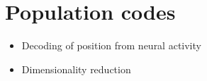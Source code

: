 \section{Population codes}
\label{chap4:sec:4:population_codes}
\begin{itemize}
    \item Decoding of position from neural activity
    \item Dimensionality reduction
\end{itemize}

